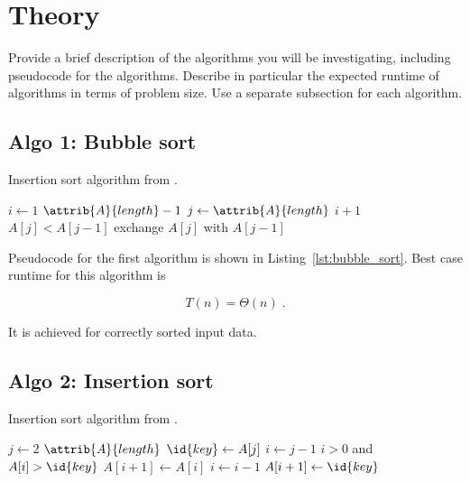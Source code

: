 \documentclass[twocolumn, sigconf, nonacm, natbib, screen, balance=False]{acmart}
\begin{document}
\section{Theory}\label{sec:theory}

Provide a brief description of the algorithms you will be
investigating, including pseudocode for the algorithms. Describe in
particular the expected runtime of algorithms in terms of problem
size.  Use a separate subsection for each algorithm.

\subsection{Algo 1: Bubble sort}\label{sec:algo1}

\begin{listing}
  \caption{Insertion sort algorithm from \citet[Ch.~2.1]{CLRS_2009}.}
  \label{lst:bubble_sort}
  \begin{codebox}
    \li \For $i \gets 1$ \To $\attrib{A}{length} - 1$
    \li \Do \For $j \gets \attrib{A}{length}$ \Downto $i + 1$
    \li 	\Do \If $A[j] < A[j - 1]$
    \li         \Then exchange $A[j]$ with $A[j - 1]$
    \End    
    \End
    \End
  \end{codebox}
\end{listing}

Pseudocode for the first algorithm is shown in
Listing~\ref{lst:bubble_sort}. Best case runtime for this algorithm
is

\begin{equation}
  T(n) = \Theta(n) \;.  \label{eq:ins_sort_best}
\end{equation}

It is achieved for correctly sorted input data.

\subsection{Algo 2: Insertion sort}\label{sec:algo2}

\begin{listing}
  \caption{Insertion sort algorithm from \citet[Ch.~2.1]{CLRS_2009}.}
  \label{lst:insertion_algo}
  \begin{codebox}
    \li \For $j \gets 2$ \To $\attrib{A}{length}$
    \li \Do
    $\id{key} \gets A[j]$
    \li     $i \gets j-1$
    \li      \While $i>0$ and $A[i] > \id{key}$
    \li      \Do
    $A[i+1] \gets A[i]$
    \li         $i \gets i-1$
    \End    
    \li       $A[i+1]\gets \id{key}$
    \End
  \end{codebox}
\end{listing}
\end{document}
